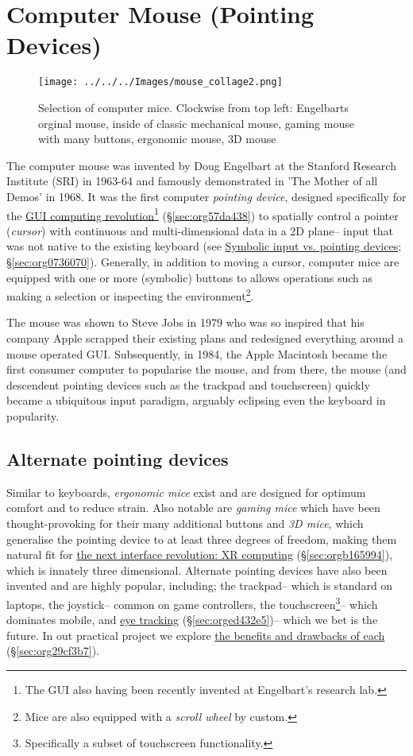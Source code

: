 \documentclass[logo,bsc,singlespacing,parskip]{infthesis}
\begin{document}
\chapter{Computer Mouse (Pointing Devices)}
\label{sec:org9f2dc02}
\begin{figure}[h]
\centering
\texttt{[image: ../../../Images/mouse\_collage2.png]}
\caption[Computer mouse collage]{Selection of computer mice. Clockwise from top left: Engelbarts orginal mouse, inside of classic mechanical mouse, gaming mouse with many buttons, ergonomic mouse, 3D mouse}
\end{figure}
The computer mouse was invented by Doug Engelbart at the Stanford Research Institute (SRI) in 1963-64 and famously demonstrated in 'The Mother of all Demos' in 1968.
It was the first computer \emph{pointing device}, designed specifically for the \hyperref[sec:org57da438]{GUI computing revolution}\footnote{The GUI also having been recently invented at Engelbart's research lab.} (\S \ref{sec:org57da438}) to spatially control a pointer (\emph{cursor}) with continuous and multi-dimensional data in a 2D plane-- input that was not native to the existing keyboard (see \hyperref[sec:org0736070]{Symbolic input vs. pointing  devices}; \S \ref{sec:org0736070}).
Generally, in addition to moving a cursor, computer mice are equipped with one or more (symbolic) buttons to allows operations such as making a selection or inspecting the environment\footnote{Mice are also equipped with a \emph{scroll wheel} by custom.}.

The mouse was shown to Steve Jobs in 1979 who was so inspired that his company Apple scrapped their existing plans and redesigned everything around a mouse operated GUI.
Subsequently, in 1984, the Apple Macintosh became the first consumer computer to popularise the mouse, and from there, the mouse (and descendent pointing devices such as the trackpad and touchscreen) quickly became a ubiquitous input paradigm, arguably eclipsing even the keyboard in popularity.

\section{Alternate pointing devices}
\label{sec:orgcd27d58}
Similar to keyboards, \emph{ergonomic mice} exist and are designed for optimum comfort and to reduce strain.
Also notable are \emph{gaming mice} which have been thought-provoking for their many additional buttons and \emph{3D mice}, which generalise the pointing device to at least three degrees of freedom, making them natural fit for \hyperref[sec:orgb165994]{the next interface revolution: XR computing} (\S  \ref{sec:orgb165994}), which is innately three dimensional.
Alternate pointing devices have also been invented and are highly popular, including; the trackpad-- which is standard on laptops, the joystick-- common on game controllers, the touchscreen\footnote{Specifically a subset of touchscreen functionality.}-- which dominates mobile, and \hyperref[sec:orged432e5]{eye tracking} (\S \ref{sec:orged432e5})-- which we bet is the future.
In out practical project we explore \hyperref[sec:org29cf3b7]{the benefits and drawbacks of each} (\S \ref{sec:org29cf3b7}).
\end{document}

